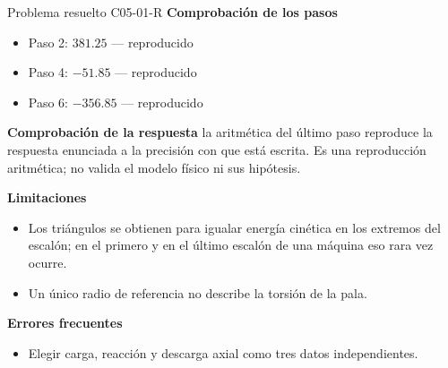 \documentclass[10pt,openany]{book}
\begin{document}
\begin{studiumworked}{Problema resuelto C05-01-R}
\noindent\textbf{Comprobación de los pasos}
\begin{itemize}
\item Paso 2: $381.25$ — reproducido
\item Paso 4: $-51.85$ — reproducido
\item Paso 6: $-356.85$ — reproducido
\end{itemize}

\noindent\textbf{Comprobación de la respuesta} la aritmética del último paso reproduce la respuesta enunciada a la precisión con que está escrita. Es una reproducción aritmética; no valida el modelo físico ni sus hipótesis.

\noindent\textbf{Limitaciones}
\begin{itemize}
\item Los triángulos se obtienen para igualar energía cinética en los extremos del escalón; en el primero y en el último escalón de una máquina eso rara vez ocurre.
\item Un único radio de referencia no describe la torsión de la pala.
\end{itemize}

\noindent\textbf{Errores frecuentes}
\begin{itemize}
\item Elegir carga, reacción y descarga axial como tres datos independientes.
\end{itemize}
\end{studiumworked}
\end{document}
